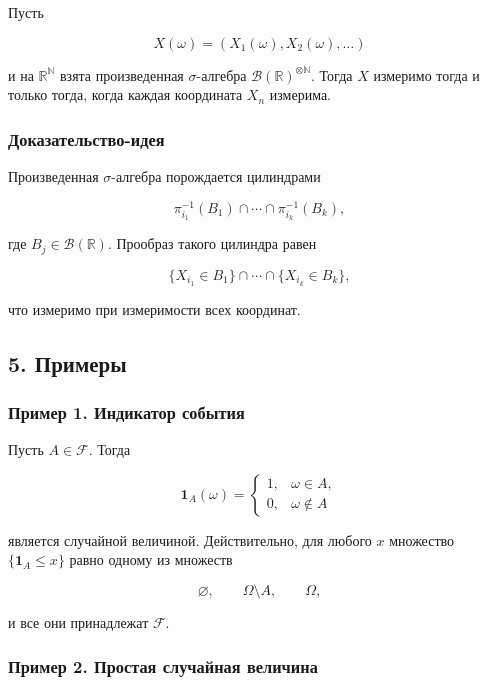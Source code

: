 \documentclass[
  11pt,
  a4paper,
]{article}
\begin{document}
Пусть

\[
X(\omega)=(X_1(\omega),X_2(\omega),\ldots)
\]

и на \(\mathbb R^{\mathbb N}\) взята произведенная \(\sigma\)-алгебра
\(\mathcal B(\mathbb R)^{\otimes\mathbb N}\). Тогда \(X\) измеримо тогда
и только тогда, когда каждая координата \(X_n\) измерима.

\subsubsection{Доказательство-идея}\label{ux434ux43eux43aux430ux437ux430ux442ux435ux43bux44cux441ux442ux432ux43e-ux438ux434ux435ux44f-2}

Произведенная \(\sigma\)-алгебра порождается цилиндрами

\[
\pi_{i_1}^{-1}(B_1)\cap\cdots\cap\pi_{i_k}^{-1}(B_k),
\]

где \(B_j\in\mathcal B(\mathbb R)\). Прообраз такого цилиндра равен

\[
\{X_{i_1}\in B_1\}\cap\cdots\cap\{X_{i_k}\in B_k\},
\]

что измеримо при измеримости всех координат.

\subsection{5. Примеры}\label{ux43fux440ux438ux43cux435ux440ux44b}

\subsubsection{Пример 1. Индикатор
события}\label{ux43fux440ux438ux43cux435ux440-1.-ux438ux43dux434ux438ux43aux430ux442ux43eux440-ux441ux43eux431ux44bux442ux438ux44f}

Пусть \(A\in\mathcal F\). Тогда

\[
\mathbf 1_A(\omega)=
\begin{cases}
1, & \omega\in A,\\
0, & \omega\notin A
\end{cases}
\]

является случайной величиной. Действительно, для любого \(x\) множество
\(\{\mathbf 1_A\le x\}\) равно одному из множеств

\[
\varnothing,\qquad \Omega\setminus A,\qquad \Omega,
\]

и все они принадлежат \(\mathcal F\).

\subsubsection{Пример 2. Простая случайная
величина}\label{ux43fux440ux438ux43cux435ux440-2.-ux43fux440ux43eux441ux442ux430ux44f-ux441ux43bux443ux447ux430ux439ux43dux430ux44f-ux432ux435ux43bux438ux447ux438ux43dux430}
\end{document}
